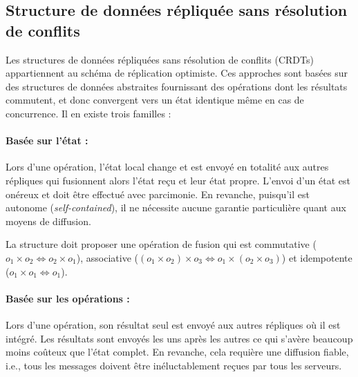 

\subsection{Structure de données répliquée sans résolution de conflits}
\label{repl:subsec:crdts}


Les structures de données répliquées sans résolution de conflits
(CRDTs)~\cite{shapiro2011comprehensive, shapiro2011conflict} appartiennent au
schéma de réplication optimiste. Ces approches sont basées sur des structures de
données abstraites fournissant des opérations dont les résultats commutent, et
donc convergent vers un état identique même en cas de concurrence.  Il en existe
trois familles :

\paragraph{Basée sur l'état :} Lors d'une opération, l'état local change et est
envoyé en totalité aux autres répliques qui fusionnent alors l'état reçu et leur
état propre. L'envoi d'un état est onéreux et doit être effectué avec
parcimonie. En revanche, puisqu'il est autonome (\emph{self-contained}), il ne
nécessite aucune garantie particulière quant aux moyens de diffusion.

\noindent La structure doit proposer une opération de fusion qui est commutative
($o_1 \times o_2 \Leftrightarrow o_2 \times o_1$), associative
($(o_1 \times o_2) \times o_3 \Leftrightarrow o_1 \times (o_2 \times o_3)$) et
idempotente ($o_1 \times o_1 \Leftrightarrow o_1$).

\paragraph{Basée sur les opérations :} Lors d'une opération, son résultat seul
est envoyé aux autres répliques où il est intégré. Les résultats sont envoyés
les uns après les autres ce qui s'avère beaucoup moins coûteux que l'état
complet. En revanche, cela requière une diffusion fiable, i.e., tous les
messages doivent être inéluctablement reçues par tous les serveurs.

